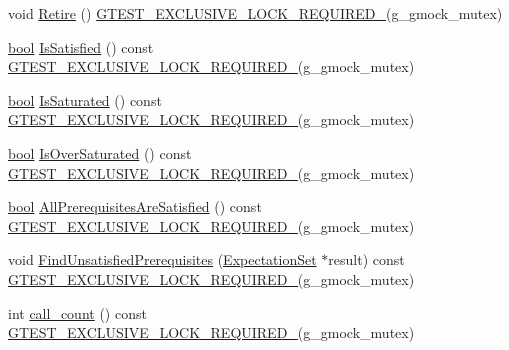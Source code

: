\begin{DoxyCompactItemize}
\item 
void \hyperlink{classtesting_1_1internal_1_1ExpectationBase_a0aeeb4c1e66c2f2aa0853c267ad3e781}{Retire} () \hyperlink{gtest-port_8h_a149f693bd59fa1bc937af54c0cdcb32f}{G\+T\+E\+S\+T\+\_\+\+E\+X\+C\+L\+U\+S\+I\+V\+E\+\_\+\+L\+O\+C\+K\+\_\+\+R\+E\+Q\+U\+I\+R\+E\+D\+\_\+}(g\+\_\+gmock\+\_\+mutex)
\item 
\hyperlink{classbool}{bool} \hyperlink{classtesting_1_1internal_1_1ExpectationBase_ae629adc2dd9aee0ac62e50314f1a6449}{Is\+Satisfied} () const \hyperlink{gtest-port_8h_a149f693bd59fa1bc937af54c0cdcb32f}{G\+T\+E\+S\+T\+\_\+\+E\+X\+C\+L\+U\+S\+I\+V\+E\+\_\+\+L\+O\+C\+K\+\_\+\+R\+E\+Q\+U\+I\+R\+E\+D\+\_\+}(g\+\_\+gmock\+\_\+mutex)
\item 
\hyperlink{classbool}{bool} \hyperlink{classtesting_1_1internal_1_1ExpectationBase_ad3e4340cedefdc24fce1478a8d6cab93}{Is\+Saturated} () const \hyperlink{gtest-port_8h_a149f693bd59fa1bc937af54c0cdcb32f}{G\+T\+E\+S\+T\+\_\+\+E\+X\+C\+L\+U\+S\+I\+V\+E\+\_\+\+L\+O\+C\+K\+\_\+\+R\+E\+Q\+U\+I\+R\+E\+D\+\_\+}(g\+\_\+gmock\+\_\+mutex)
\item 
\hyperlink{classbool}{bool} \hyperlink{classtesting_1_1internal_1_1ExpectationBase_a080dab35ecc6c57096f50758a0e8123d}{Is\+Over\+Saturated} () const \hyperlink{gtest-port_8h_a149f693bd59fa1bc937af54c0cdcb32f}{G\+T\+E\+S\+T\+\_\+\+E\+X\+C\+L\+U\+S\+I\+V\+E\+\_\+\+L\+O\+C\+K\+\_\+\+R\+E\+Q\+U\+I\+R\+E\+D\+\_\+}(g\+\_\+gmock\+\_\+mutex)
\item 
\hyperlink{classbool}{bool} \hyperlink{classtesting_1_1internal_1_1ExpectationBase_a82ba68cdd71a8b5aff5a5be24c23a637}{All\+Prerequisites\+Are\+Satisfied} () const \hyperlink{gtest-port_8h_a149f693bd59fa1bc937af54c0cdcb32f}{G\+T\+E\+S\+T\+\_\+\+E\+X\+C\+L\+U\+S\+I\+V\+E\+\_\+\+L\+O\+C\+K\+\_\+\+R\+E\+Q\+U\+I\+R\+E\+D\+\_\+}(g\+\_\+gmock\+\_\+mutex)
\item 
void \hyperlink{classtesting_1_1internal_1_1ExpectationBase_a9eb518c079f950a59c67e8012d3371c0}{Find\+Unsatisfied\+Prerequisites} (\hyperlink{classtesting_1_1ExpectationSet}{Expectation\+Set} $\ast$result) const \hyperlink{gtest-port_8h_a149f693bd59fa1bc937af54c0cdcb32f}{G\+T\+E\+S\+T\+\_\+\+E\+X\+C\+L\+U\+S\+I\+V\+E\+\_\+\+L\+O\+C\+K\+\_\+\+R\+E\+Q\+U\+I\+R\+E\+D\+\_\+}(g\+\_\+gmock\+\_\+mutex)
\item 
int \hyperlink{classtesting_1_1internal_1_1ExpectationBase_aacc0399271907194ac1627439f65047a}{call\+\_\+count} () const \hyperlink{gtest-port_8h_a149f693bd59fa1bc937af54c0cdcb32f}{G\+T\+E\+S\+T\+\_\+\+E\+X\+C\+L\+U\+S\+I\+V\+E\+\_\+\+L\+O\+C\+K\+\_\+\+R\+E\+Q\+U\+I\+R\+E\+D\+\_\+}(g\+\_\+gmock\+\_\+mutex)

\end{DoxyCompactItemize}
